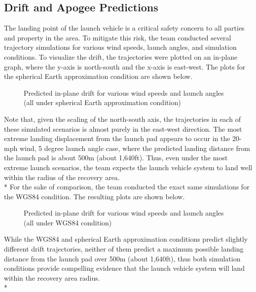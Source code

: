 \subsection{Drift and Apogee Predictions}
The landing point of the launch vehicle is a critical safety concern to all parties and property in the area. To mitigate this risk, the team conducted several trajectory simulations for various wind speeds, launch angles, and simulation conditions. To visualize the drift, the trajectories were plotted on an in-plane graph, where the y-axis is north-south and the x-axis is east-west. The plots for the spherical Earth approximation condition are shown below.
\begin{figure}[h]
    \centering
    \caption{Predicted in-plane drift for various wind speeds and launch angles (all under spherical Earth approximation condition)}
    \label{fig:my_label}
\end{figure}
Note that, given the scaling of the north-south axis, the trajectories in each of these simulated scenarios is almost purely in the east-west direction. The most extreme landing displacement from the launch pad appears to occur in the 20-mph wind, 5 degree launch angle case, where the predicted landing distance from the launch pad is about 500m (about 1,640ft). Thus, even under the most extreme launch scenarios, the team expects the launch vehicle system to land well within the radius of the recovery area.
\\*
\newline
For the sake of comparison, the team conducted the exact same simulations for the WGS84 condition. The resulting plots are shown below.
\begin{figure}[h]
    \centering
    \caption{Predicted in-plane drift for various wind speeds and launch angles (all under WGS84 condition)}
    \label{fig:my_label}
\end{figure}
While the WGS84 and spherical Earth approximation conditions predict slightly different drift trajectories, neither of them predict a maximum possible landing distance from the launch pad over 500m (about 1,640ft), thus both simulation conditions provide compelling evidence that the launch vehicle system will land within the recovery area radius.
\\*
\newline
